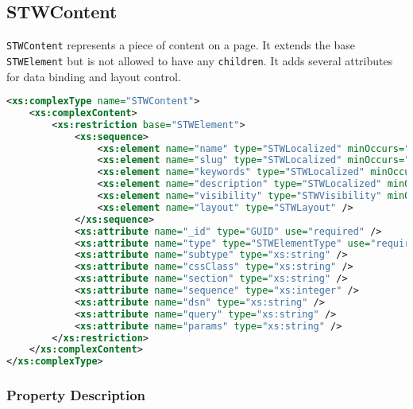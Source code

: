 \subsection{STWContent}

\texttt{STWContent} represents a piece of content on a page. It extends the base \texttt{STWElement} but is not allowed to have any \texttt{children}. It adds several attributes for data binding and layout control.

\begin{lstlisting}[language=XML,caption={STWContent Type Definition}]
<xs:complexType name="STWContent">
    <xs:complexContent>
        <xs:restriction base="STWElement">
            <xs:sequence>
                <xs:element name="name" type="STWLocalized" minOccurs="1" />
                <xs:element name="slug" type="STWLocalized" minOccurs="1" />
                <xs:element name="keywords" type="STWLocalized" minOccurs="0" />
                <xs:element name="description" type="STWLocalized" minOccurs="0" />
                <xs:element name="visibility" type="STWVisibility" minOccurs="0" />
                <xs:element name="layout" type="STWLayout" />
            </xs:sequence>
            <xs:attribute name="_id" type="GUID" use="required" />
            <xs:attribute name="type" type="STWElementType" use="required" fixed="Content" />
            <xs:attribute name="subtype" type="xs:string" />
            <xs:attribute name="cssClass" type="xs:string" />
            <xs:attribute name="section" type="xs:string" />
            <xs:attribute name="sequence" type="xs:integer" />
            <xs:attribute name="dsn" type="xs:string" />
            <xs:attribute name="query" type="xs:string" />
            <xs:attribute name="params" type="xs:string" />
        </xs:restriction>
    </xs:complexContent>
</xs:complexType>
\end{lstlisting}

\subsubsection{Property Description}

